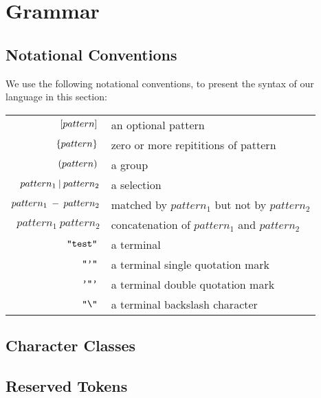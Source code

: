\section{Grammar}

\subsection{Notational Conventions}
We use the following notational conventions, to present the
syntax of our language in this section:

\begin{center}
\begin{tabular}{r l}
  $\: [pattern] \:$ & an optional pattern \\
  $\: \{pattern\} \:$ & zero or more repititions of pattern \\
  $\: (pattern) \:$ & a group \\
  $pattern_1 \: | \: pattern_2$ & a selection \\
  $pattern_1 \: - \: pattern_2$ & matched by $pattern_1$ but not by $pattern_2$\\
  $pattern_1 \: pattern_2$ & concatenation of $pattern_1$ and $pattern_2$ \\
  $\: \texttt{"test"} \:$ & a terminal \\
  $\: \texttt{"'"} \:$ & a terminal single quotation mark \\
  $\: \texttt{'"'} \:$ & a terminal double quotation mark \\
  $\: \texttt{"\textbackslash"} \:$ & a terminal backslash character \\
\end{tabular}
\end{center}

\subsection{Character Classes}
\begin{ebnf}
\end{ebnf}
\subsection{Reserved Tokens}
\begin{ebnf}
\end{ebnf}
